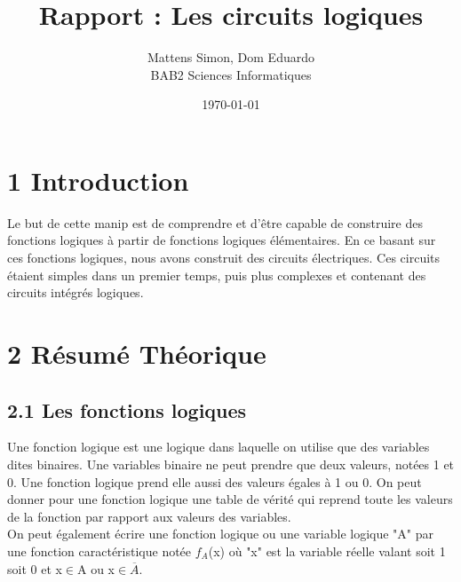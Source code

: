 \documentclass{report}
\title{Rapport : Les circuits logiques}
\author{Mattens Simon, Dom Eduardo\\ BAB2 Sciences Informatiques}
\date{\today}
\begin{document}
\maketitle

\section*{1 Introduction}

\hspace*{1,5cm}Le but de cette manip est de comprendre et d'\^etre capable de construire des fonctions logiques \`a partir de fonctions logiques \'el\'ementaires. En ce basant sur ces fonctions logiques, nous avons construit des circuits \'electriques. Ces circuits \'etaient simples dans un premier temps, puis plus complexes et contenant des circuits int\'egr\'es logiques.\\

\section*{2 R\'esum\'e Th\'eorique}
\subsection*{2.1 Les fonctions logiques}
\hspace*{1,5cm} Une fonction logique est une logique dans laquelle on utilise que des variables dites binaires. Une variables binaire ne peut prendre que deux valeurs, not\'ees 1 et 0. Une fonction logique prend elle aussi des valeurs \'egales \`a 1 ou 0. On peut donner pour une fonction logique une table de v\'erit\'e qui reprend toute les valeurs de la fonction par rapport aux valeurs des variables.\\

On peut \'egalement \'ecrire une fonction logique ou une variable logique "A" par une fonction caract\'eristique not\'ee $f_{A}$(x) o\`u "x" est la variable r\'eelle valant soit 1 soit 0 et x$\in$A ou x$\in\overline{A}.$\\
\end{document}
